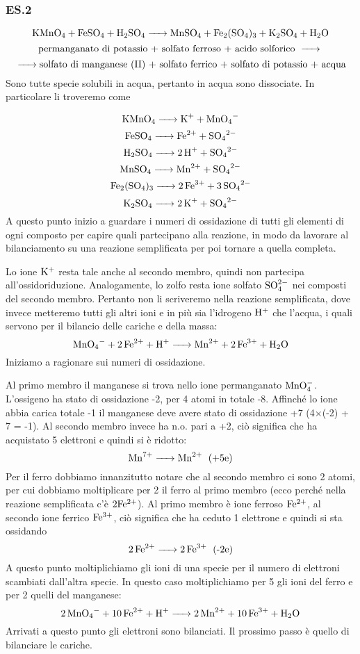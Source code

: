 \subsubsection{\textbf{ES.2}}
$$\ce{KMnO_4 + FeSO_4 + H_2SO_4 -> MnSO_4 + Fe_2(SO_4)_3 + K_2SO_4 + H_2O}$$
$$\text{permanganato di potassio + solfato ferroso + acido solforico \ce{->}}$$
$$\ce{->}\text{solfato di manganese (II) + solfato ferrico + solfato di potassio + acqua}$$
Sono tutte specie solubili in acqua, pertanto in acqua sono dissociate. In particolare li troveremo come

$$\ce{KMnO_4 -> K^+ + MnO_4^-}$$
$$\ce{FeSO_4 -> Fe^{2+} + SO_4^{2-}}$$
$$\ce{H_2SO_4 -> 2 H^+ + SO_4^{2-}}$$
$$\ce{MnSO_4 -> Mn^{2+} + SO_4^{2-}}$$
$$\ce{Fe_2(SO_4)_3 -> 2 Fe^{3+} + 3 SO_4^{2-}}$$
$$\ce{K_2SO_4 -> 2 K^+ + SO_4^{2-}}$$
A questo punto inizio a guardare i numeri di ossidazione di tutti gli elementi di ogni composto per capire quali partecipano alla reazione, in modo da lavorare al bilanciamento su una reazione semplificata per poi tornare a quella completa.

Lo ione $\rm K^+$ resta tale anche al secondo membro, quindi non partecipa all'ossidoriduzione. Analogamente, lo zolfo resta ione solfato $\rm SO_4^{2-}$ nei composti del secondo membro. Pertanto non li scriveremo nella reazione semplificata, dove invece metteremo tutti gli altri ioni e in più sia l'idrogeno $\rm H^+$ che l'acqua, i quali servono per il bilancio delle cariche e della massa:
$$\ce{MnO_4- + 2Fe^2+ + H+ -> Mn^2+ + 2Fe^3+ + H_2O}$$
Iniziamo a ragionare sui numeri di ossidazione.

Al primo membro il manganese si trova nello ione permanganato $\rm MnO_4^-$. L'ossigeno ha stato di ossidazione -2, per 4 atomi in totale -8. Affinché lo ione abbia carica totale -1 il manganese deve avere stato di ossidazione +7 (4$\times$(-2) + 7 = -1). Al secondo membro invece ha n.o. pari a +2, ciò significa che ha acquistato 5 elettroni e quindi si è ridotto:
$$\ce{Mn^7+ -> Mn^2+ \; \text{(+5e)}}$$
Per il ferro dobbiamo innanzitutto notare che al secondo membro ci sono 2 atomi, per cui dobbiamo moltiplicare per 2 il ferro al primo membro (ecco perché nella reazione semplificata c'è $\rm 2Fe^{2+}$). Al primo membro è ione ferroso $\rm Fe^{2+}$, al secondo ione ferrico $\rm Fe^{3+}$, ciò significa che ha ceduto 1 elettrone e quindi si sta ossidando
$$\ce{2Fe^2+ -> 2Fe^3+ \; \text{(-2e)}}$$
A questo punto moltiplichiamo gli ioni di una specie per il numero di elettroni scambiati dall'altra specie. In questo caso moltiplichiamo per 5 gli ioni del ferro e per 2 quelli del manganese:
$$\ce{2MnO_4- + 10Fe^2+ + H+ -> 2Mn^2+ + 10Fe^3+ + H_2O}$$
Arrivati a questo punto gli elettroni sono bilanciati. Il prossimo passo è quello di bilanciare le cariche.


